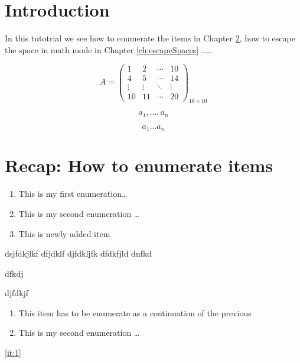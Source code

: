 \documentclass{report}
\begin{document}
\chapter{Introduction}
 In this tutotrial we see how to enumerate the items in Chapter \ref{ch:enumeration}, how to escape the space in math mode in Chapter \ref{ch:escapeSpaces} \dots \ldots  
 
 \begin{equation}
 	A = \begin{pmatrix}
 	  1 & 2 & \cdots & 10  \\
 	  4 & 5 &  \cdots & 14\\
 	  \vdots  & \vdots & \ddots & \vdots  \\
 	  10 & 11 & \cdots & 20 	  
 	\end{pmatrix}_{10 \times 10}
 \end{equation}

\begin{equation}
	a_1, \dots, a_n
\end{equation}

\begin{equation}
	a_1 \dots a_n
	\end{equation}



\chapter{Recap: How to enumerate items}\label{ch:enumeration}

\begin{enumerate}[label={(\alph*)}, start = 5]
	\item This is my first enumeration\dots 
	\item This is my second enumeration \dots 
	\item This is newly added item
\end{enumerate}

dsjfdkjlkf
dfjdklf
djfdkljfk
dfdkfjld
dnfkd

dfkdj

djfdkjf


\begin{enumerate}[label={(\alph*)}, resume]
	\item \label{it:1} This item has to be enumerate as a continuation of the previous 
	\item This is my second enumeration \dots 
\end{enumerate}

\ref{it:1}
\end{document}
